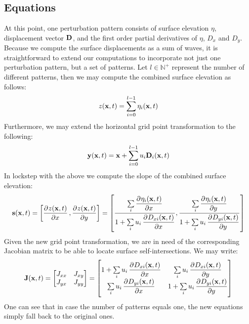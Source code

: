 \subsection{Equations}
At this point, one perturbation pattern consists of surface
elevation $\eta$, displacement vector $\mathbf{D}$, and the first order partial
derivatives of $\eta$, $D_x$ and $D_y$. Because we compute the surface
displacements as a sum of waves, it is straightforward to extend our
computations to incorporate not just one perturbation pattern, but a set of
patterns. Let $l \in \mathbb{N}^+$ represent the number of different patterns,
then we may compute the combined surface elevation as follows:
\begin{equation}
 z(\mathbf{x},t) = \sum\limits_{i=0}^{l-1}\eta_i(\mathbf{x},t)
\end{equation}
Furthermore, we may extend the horizontal grid point transformation to the
following:
\begin{equation}
\mathbf{y}(\mathbf{x},t) = \mathbf{x}+\sum\limits_{i=0}^{l-1}u_i\mathbf{D}_i(\mathbf{x},t) 
\end{equation}
In lockstep with the above we compute the slope of the combined surface elevation:
\begin{equation}
\mvec{s}(\mvec{x},t) = \left[\dpd{z(\mvec{x},t)}{x},\dpd{z(\mvec{x},t)}{y}\right] = \left[\frac{\sum\limits_i \dpd{\eta_i(\mvec{x},t)}{x}}{1 
+ \sum\limits_i u_i \dpd{D_{xi}(\mvec{x},t)}{x}}, \frac{\sum\limits_i 
\dpd{\eta_i(\mvec{x},t)}{y}}{1 + \sum\limits_i 
u_i\dpd{D_{yi}(\mvec{x},t)}{y}}\right]
\end{equation}
Given the new grid point transformation, we are in need of the corresponding
Jacobian matrix to be able to locate surface self-intersections. We may write:
\begin{equation}
\label{eq:jacobian_of_displacement_multi}
 \mvec{J}(\mvec{x},t) =
 \begin{bmatrix}
 J_{xx} & J_{xy} \\
 J_{yx} & J_{yy}
 \end{bmatrix}
 =
 \begin{bmatrix}
   1 + \sum\limits_i u_i\dpd{D_{xi}(\mvec{x},t)}{x} & \sum\limits_i u_i\dpd{D_{xi}(\mvec{x},t)}{y} \\
   \sum\limits_i u_i\dpd{D_{yi}(\mvec{x},t)}{x} & 1 + \sum\limits_i u_i\dpd{D_{yi}(\mvec{x},t)}{y}
 \end{bmatrix}
\end{equation}
%
One can see that in case the number of patterns equals one, the new equations
simply fall back to the original ones.
